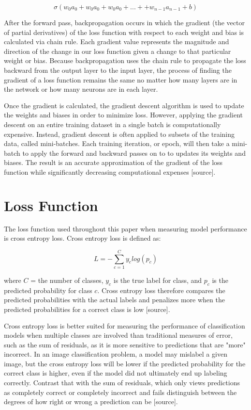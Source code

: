 \documentclass [MS] {uclathes}
\begin{document}
\[\sigma(w_0a_0 + w_0a_0 + w_0a_0 + ... + + w_{n-1}a_{n-1} + b)\]

After the forward pass, backpropagation occurs in which the gradient (the vector of partial derivatives) of the loss 
function with respect to each weight and bias is calculated via chain rule. Each gradient value represents the magnitude 
and direction of the change in our loss function given a change to that particular weight or bias. Because 
backpropagation uses the chain rule to propagate the loss backward from the output layer to the input layer, the process 
of finding the gradient of a loss function remains the same no matter how many layers are in the network or how many 
neurons are in each layer.

Once the gradient is calculated, the gradient descent algorithm is used to update the weights and biases in order to 
minimize loss. However, applying the gradient descent on an entire training dataset in a single batch is computationally 
expensive. Instead, gradient descent is often applied to subsets of the training data, called mini-batches. Each 
training iteration, or epoch, will then take a mini-batch to apply the forward and backward passes on to to updates its 
weights and biases. The result is an accurate approximation of the gradient of the loss function while significantly 
decreasing computational expenses [source].

\section{Loss Function}
The loss function used throughout this paper when measuring model performance is cross entropy loss. Cross entropy loss 
is defined as:

\[L = -\sum_{c=1}^{C}y_{c}log(p_{c})\]

where \(C\) = the number of classes, \(y_{c}\) is the true label for class, and \(p_{c}\) is the predicted probability 
for class \(c\). Cross entropy loss therefore compares the predicted probabilities with the actual labels and penalizes 
more when the predicted probabilities for a correct class is low [source].

Cross entropy loss is better suited for measuring the performance of classification models when multiple classes are 
involved than traditional measures of error, such as the sum of residuals, as it is more sensitive to predictions that 
are "more" incorrect. In an image classification problem, a model may mislabel a given image, but the cross entropy loss 
will be lower if the predicted probability for the correct class is higher, even if the model did not ultimately end up 
labeling correctly. Contrast that with the sum of residuals, which only views predictions as completely correct or 
completely incorrect and fails distinguish between the degrees of how right or wrong a prediction can be [source].
\end{document}
